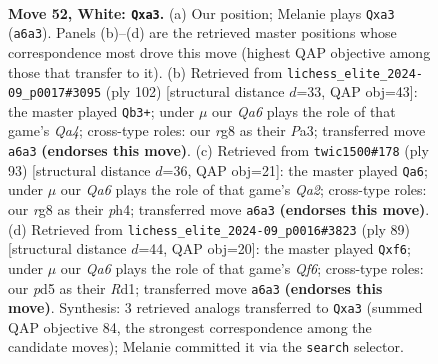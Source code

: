 \documentclass[11pt]{article}
\begin{document}
\clearpage

\begin{figure}[p]\centering
\begin{subfigure}{0.46\textwidth}\centering
\resizebox{\linewidth}{!}{%
\newchessgame
\chessboard[
  setfen={6r1/8/Q4p2/3p1k2/4qP2/p5P1/P6P/6K1 w - - 23 52},
  showmover=false,
  pgfstyle=straightmove, color=movearrow, markmove={a6-a3}
]}
\caption{}
\end{subfigure}\hfill
\begin{subfigure}{0.46\textwidth}\centering
\resizebox{\linewidth}{!}{%
\newchessgame
\chessboard[
  setfen={8/8/8/5p2/Q2p1p2/P2k2qP/1P4P1/6K1 w - - 0 52},
  showmover=false,
  pgfstyle=straightmove, color=movearrow, markmove={a4-b3}
]}
\caption{}
\end{subfigure}
\\[4pt]
\begin{subfigure}{0.46\textwidth}\centering
\resizebox{\linewidth}{!}{%
\newchessgame
\chessboard[
  setfen={6k1/q4p2/6p1/3Q3p/7P/3p1KP1/5P2/8 b - - 1 47},
  showmover=false,
  pgfstyle=straightmove, color=movearrow, markmove={a7-a6}
]}
\caption{}
\end{subfigure}\hfill
\begin{subfigure}{0.46\textwidth}\centering
\resizebox{\linewidth}{!}{%
\newchessgame
\chessboard[
  setfen={6k1/5p2/5PpQ/2p5/8/pP3q1P/6RK/3r4 b - - 4 45},
  showmover=false,
  pgfstyle=straightmove, color=movearrow, markmove={f3-f6}
]}
\caption{}
\end{subfigure}
\caption{\textbf{Move 52, White: \texttt{Qxa3}.} (a) Our position; Melanie plays \texttt{Qxa3} (\texttt{a6a3}). Panels (b)--(d) are the retrieved master positions whose correspondence most drove this move (highest QAP objective among those that transfer to it). (b) Retrieved from \texttt{lichess\_elite\_2024-09\_p0017\#3095} (ply 102) [structural distance $d$=33, QAP obj=43]: the master played \texttt{Qb3+}; under $\mu$ our \emph{Qa6} plays the role of that game's \emph{Qa4}; cross-type roles: our \emph{r}g8 as their \emph{P}a3; transferred move \texttt{a6a3} \textbf{(endorses this move)}. (c) Retrieved from \texttt{twic1500\#178} (ply 93) [structural distance $d$=36, QAP obj=21]: the master played \texttt{Qa6}; under $\mu$ our \emph{Qa6} plays the role of that game's \emph{Qa2}; cross-type roles: our \emph{r}g8 as their \emph{p}h4; transferred move \texttt{a6a3} \textbf{(endorses this move)}. (d) Retrieved from \texttt{lichess\_elite\_2024-09\_p0016\#3823} (ply 89) [structural distance $d$=44, QAP obj=20]: the master played \texttt{Qxf6}; under $\mu$ our \emph{Qa6} plays the role of that game's \emph{Qf6}; cross-type roles: our \emph{p}d5 as their \emph{R}d1; transferred move \texttt{a6a3} \textbf{(endorses this move)}. Synthesis: 3 retrieved analogs transferred to \texttt{Qxa3} (summed QAP objective 84, the strongest correspondence among the candidate moves); Melanie committed it via the \texttt{search} selector.}
\label{fig:thought-m102}
\end{figure}
\end{document}
